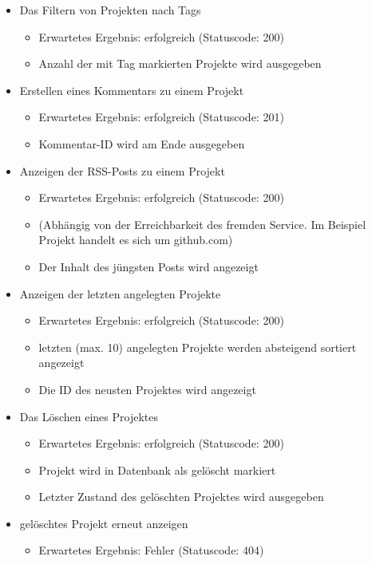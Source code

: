 \documentclass[12pt]{scrartcl}
\begin{document}
\begin{itemize}
				
				\item Das Filtern von Projekten nach Tags
				\begin{itemize}
					\item Erwartetes Ergebnis: erfolgreich (Statuscode: 200)
					\item Anzahl der mit Tag markierten Projekte wird ausgegeben
				\end{itemize}
				\item Erstellen eines Kommentars zu einem Projekt
				\begin{itemize}
					\item Erwartetes Ergebnis: erfolgreich (Statuscode: 201)
					\item Kommentar-ID wird am Ende ausgegeben
				\end{itemize}
				\item Anzeigen der RSS-Posts zu einem Projekt
				\begin{itemize}
					\item Erwartetes Ergebnis: erfolgreich (Statuscode: 200)
					\item (Abhängig von der Erreichbarkeit des fremden Service. Im Beispiel Projekt handelt es sich um github.com)
					\item Der Inhalt des jüngsten Posts wird angezeigt
				\end{itemize}
				\item Anzeigen der letzten angelegten Projekte
				\begin{itemize}
					\item Erwartetes Ergebnis: erfolgreich (Statuscode: 200)
					\item letzten (max. 10) angelegten Projekte werden absteigend sortiert angezeigt
					\item Die ID des neusten Projektes wird angezeigt
				\end{itemize}
				\item Das Löschen eines Projektes
				\begin{itemize}
					\item Erwartetes Ergebnis: erfolgreich (Statuscode: 200)
					\item Projekt wird in Datenbank als gelöscht markiert
					\item Letzter Zustand des gelöschten Projektes wird ausgegeben
				\end{itemize}
				\item gelöschtes Projekt erneut anzeigen
				\begin{itemize}
					\item Erwartetes Ergebnis: Fehler (Statuscode: 404)
				\end{itemize}
			\end{itemize}
		
\end{document}

